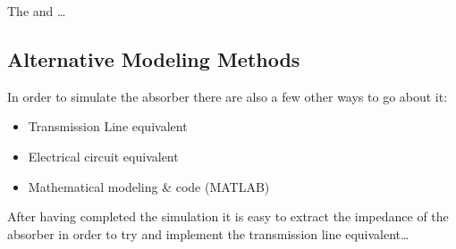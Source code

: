         \begin{center}
            \begin{minipage}{.45\textwidth}
                \label{plt:S11_Zmax}
            \end{minipage}
            \begin{minipage}{.45\textwidth}
                \label{plt:Absorptivity}
            \end{minipage}
        \end{center}
       
        The \epsilon and \mu \dots

    \subsection{\textsf{Alternative Modeling Methods}}
        In order to simulate the absorber there are also a few other ways to go about it:
        \begin{itemize}
            \item Transmission Line equivalent
            \item Electrical circuit equivalent
            \item Mathematical modeling \& code (MATLAB)
        \end{itemize}
        
        After having completed the simulation it is easy to extract the impedance of the
        absorber in order to try and implement the transmission line equivalent\dots